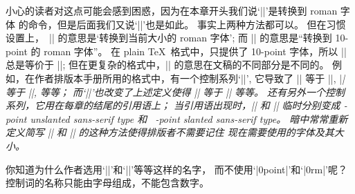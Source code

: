 小心的读者对这点可能会感到困惑，因为在本章开头我们说`|\rm|'是转换到 roman 字体%
的命令，但是后面我们又说`|\tenrm|'也是如此。%
事实上两种方法都可以。%
但在习惯设置上，~|\rm| 的意思是`转换到当前大小的 roman 字体';
而 |\tenrm| 的意思是``转换到 10-point 的 roman 字体''。%
在 plain \TeX\ 格式中，只提供了 10-point 字体，所以 |\rm| 总是等价于 |\tenrm|;
但在更复杂的格式中，|\rm| 的意思在文稿的不同部分是不同的。%
例如，在作者排版本手册所用的格式中，有一个控制系列`|\tenpoint|',
它导致了 |\rm| 等于 |\tenrm|, |\sl| 等于 |\tensl|, 等等；
而`|\ninepoint|'也改变了上述定义使得 |\rm| 等于 |\ninerm| 等等。%
还有另外一个控制系列，它用在每章的结尾的引用语上；
当引用语出现时，|\rm| 和 |\sl| 临时分别变成 {-point
unslanted sans-serif type} 和%
~{-point slanted sans-serif type}。%
暗中常常重新定义简写 |\rm| 和 |\sl| 的这种方法使得排版者不需要记住%
现在需要使用的字体及其大小。

\exercise \1你知道为什么作者选用`|\tenpoint|'和`|\tenrm|'等等这样的名字，
而不使用`|\10point|'和`|\10rm|'\allowbreak\hbox{呢？}
\answer \1控制词的名称只能由字母组成，不能包含数字。

